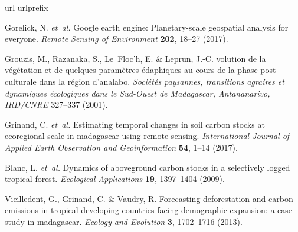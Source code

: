 \documentclass[
  12pt,
]{article}
\begin{document}
\begin{thebibliography}{99}
\expandafter\ifx\csname url\endcsname\relax
  \def\url#1{\texttt{#1}}\fi
\expandafter\ifx\csname urlprefix\endcsname\relax\def\urlprefix{URL }\fi
\providecommand{\bibinfo}[2]{#2}
\providecommand{\eprint}[2][]{\url{#2}}

\bibinfo{author}{Gorelick, N.} \emph{et~al.}
\newblock \bibinfo{title}{Google earth engine: Planetary-scale geospatial
  analysis for everyone}.
\newblock \emph{\bibinfo{journal}{Remote Sensing of Environment}}
  \textbf{\bibinfo{volume}{202}}, \bibinfo{pages}{18--27}
  (\bibinfo{year}{2017}).

\bibinfo{author}{Grouzis, M.}, \bibinfo{author}{Razanaka, S.},
  \bibinfo{author}{Le~Floc’h, E.} \& \bibinfo{author}{Leprun, J.-C.}
\newblock \bibinfo{title}{{\'E}volution de la v{\'e}g{\'e}tation et de quelques
  param{\`e}tres {\'e}daphiques au cours de la phase post-culturale dans la
  r{\'e}gion d’analabo}.
\newblock \emph{\bibinfo{journal}{Soci{\'e}t{\'e}s paysannes, transitions
  agraires et dynamiques {\'e}cologiques dans le Sud-Ouest de Madagascar,
  Antananarivo, IRD/CNRE}} \bibinfo{pages}{327--337} (\bibinfo{year}{2001}).

\bibinfo{author}{Grinand, C.} \emph{et~al.}
\newblock \bibinfo{title}{Estimating temporal changes in soil carbon stocks at
  ecoregional scale in madagascar using remote-sensing}.
\newblock \emph{\bibinfo{journal}{International Journal of Applied Earth
  Observation and Geoinformation}} \textbf{\bibinfo{volume}{54}},
  \bibinfo{pages}{1--14} (\bibinfo{year}{2017}).

\bibinfo{author}{Blanc, L.} \emph{et~al.}
\newblock \bibinfo{title}{Dynamics of aboveground carbon stocks in a
  selectively logged tropical forest}.
\newblock \emph{\bibinfo{journal}{Ecological Applications}}
  \textbf{\bibinfo{volume}{19}}, \bibinfo{pages}{1397--1404}
  (\bibinfo{year}{2009}).

\bibinfo{author}{Vieilledent, G.}, \bibinfo{author}{Grinand, C.} \&
  \bibinfo{author}{Vaudry, R.}
\newblock \bibinfo{title}{Forecasting deforestation and carbon emissions in
  tropical developing countries facing demographic expansion: a case study in
  madagascar}.
\newblock \emph{\bibinfo{journal}{Ecology and Evolution}}
  \textbf{\bibinfo{volume}{3}}, \bibinfo{pages}{1702--1716}
  (\bibinfo{year}{2013}).


\end{thebibliography}
\end{document}
